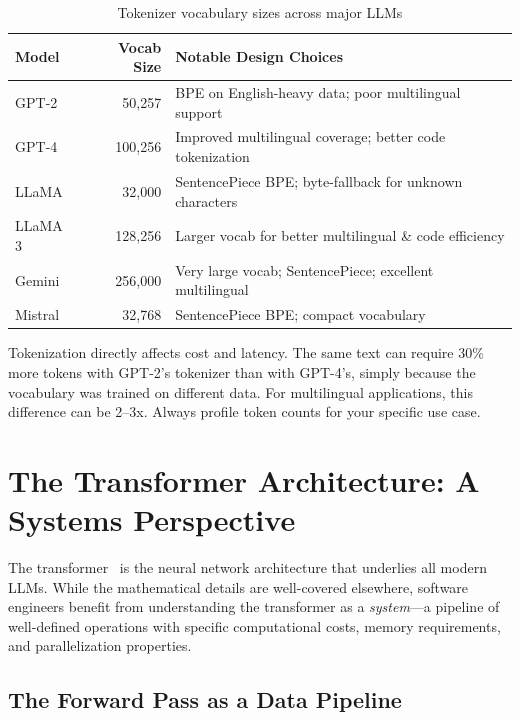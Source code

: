 \begin{table}[htbp]
\centering
\caption{Tokenizer vocabulary sizes across major LLMs}
\label{tab:tokenizer-sizes}
\begin{tabularx}{\textwidth}{lrX}
\toprule
\textbf{Model} & \textbf{Vocab Size} & \textbf{Notable Design Choices} \\
\midrule
GPT-2       & 50,257  & BPE on English-heavy data; poor multilingual support \\
GPT-4       & 100,256 & Improved multilingual coverage; better code tokenization \\
LLaMA       & 32,000  & SentencePiece BPE; byte-fallback for unknown characters \\
LLaMA 3     & 128,256 & Larger vocab for better multilingual \& code efficiency \\
Gemini      & 256,000 & Very large vocab; SentencePiece; excellent multilingual \\
Mistral     & 32,768  & SentencePiece BPE; compact vocabulary \\
\bottomrule
\end{tabularx}
\end{table}

\begin{cautionbox}
Tokenization directly affects cost and latency. The same text can require 30\% more tokens with GPT-2's tokenizer than with GPT-4's, simply because the vocabulary was trained on different data. For multilingual applications, this difference can be 2--3x. Always profile token counts for your specific use case.
\end{cautionbox}

\section{The Transformer Architecture: A Systems Perspective}
\label{sec:transformer}

The transformer~\cite{vaswani2017attention} is the neural network architecture that underlies all modern LLMs. While the mathematical details are well-covered elsewhere, software engineers benefit from understanding the transformer as a \emph{system}---a pipeline of well-defined operations with specific computational costs, memory requirements, and parallelization properties.

\subsection{The Forward Pass as a Data Pipeline}

